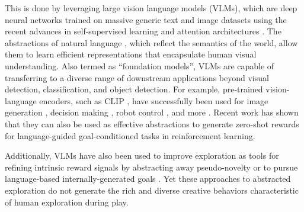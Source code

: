 This is done by leveraging large vision language models (VLMs), which are deep neural networks trained on massive generic text and image datasets using the recent advances in self-supervised learning \citep{ssl} and attention architectures \citep{vit}. 
The abstractions of natural language \citep{languageforlearning,vlmhumans}, which reflect the semantics of the world, allow them to learn efficient representations that encapsulate human visual understanding.
% 
Also termed as ``foundation models'', VLMs are capable of transferring to a diverse range of downstream applications beyond visual detection, classification, and object detection.
For example, pre-trained vision-language encoders, such as CLIP \citep{clip}, have successfully been used for image generation \citep{imagegeneration}, decision making \citep{decision_making_clip}, robot control \citep{cliport,embodied}, and more \citep{vlmsurvey}.
% 
% 
Recent work \citep{zest,negprompt,vlmrm,lamp} has shown that they can also be used as effective abstractions to generate zero-shot rewards for language-guided goal-conditioned tasks in reinforcement learning.

Additionally, VLMs have also been used to improve exploration as tools for refining intrinsic reward signals by abstracting away pseudo-novelty \citep{vlmdistill} or to pursue language-based internally-generated goals \citep{vlmlang}.
Yet these approaches to abstracted exploration do not generate the rich and diverse creative behaviors characteristic of human exploration during play. 

